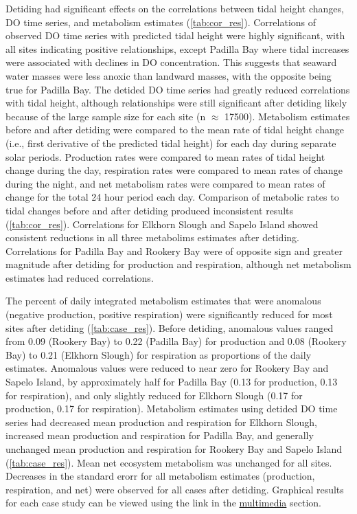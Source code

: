 \documentclass[letterpaper,12pt,oneside]{article}\usepackage[]{graphicx}\usepackage[]{color}
\begin{document}
Detiding had significant effects on the correlations between tidal height changes, \ac{DO} time series, and metabolism estimates (\cref{tab:cor_res}).  Correlations of observed \ac{DO} time series with predicted tidal height were highly significant, with all sites indicating positive relationships, except Padilla Bay where tidal increases were associated with declines in \ac{DO}  concentration.  This suggests that seaward water masses were less anoxic than landward masses, with the opposite being true for Padilla Bay. The detided \ac{DO} time series had greatly reduced correlations with tidal height, although relationships were still significant after detiding likely because of the large sample size for each site (n $\approx$ 17500). Metabolism estimates before and after detiding were compared to the mean rate of tidal height change (i.e., first derivative of the predicted tidal height) for each day during separate solar periods.  Production rates were compared to mean rates of tidal height change during the day, respiration rates were compared to mean rates of change during the night, and net metabolism rates were compared to mean rates of change for the total 24 hour period each day.  Comparison of metabolic rates to tidal changes before and after detiding produced inconsistent results (\cref{tab:cor_res}).  Correlations for Elkhorn Slough and Sapelo Island showed consistent reductions in all three metabolims estimates after detiding.  Correlations for Padilla Bay and Rookery Bay were of opposite sign and greater magnitude after detiding for production and respiration, although net metabolism estimates had reduced correlations.  

The percent of daily integrated metabolism estimates that were anomalous (negative production, positive respiration) were significantly reduced for most sites after detiding (\cref{tab:case_res}).  Before detiding, anomalous values ranged from 0.09 (Rookery Bay) to 0.22 (Padilla Bay) for production and 0.08 (Rookery Bay) to 0.21 (Elkhorn Slough) for respiration as proportions of the daily estimates. Anomalous values were reduced to near zero for Rookery Bay and Sapelo Island, by approximately half for Padilla Bay (0.13 for production, 0.13 for respiration), and only slightly reduced for Elkhorn Slough (0.17 for production, 0.17 for respiration).  Metabolism estimates using detided \ac{DO} time series had decreased mean production and respiration for Elkhorn Slough, increased mean production and respiration for Padilla Bay, and generally unchanged mean production and respiration for Rookery Bay and Sapelo Island (\cref{tab:case_res}).  Mean net ecosystem metabolism was unchanged for all sites.  Decreases in the standard erorr for all metabolism estimates (production, respiration, and net) were observed for all cases after detiding.  Graphical results for each case study can be viewed using the link in the \hyperref[multi]{multimedia} section.  
\end{document}
